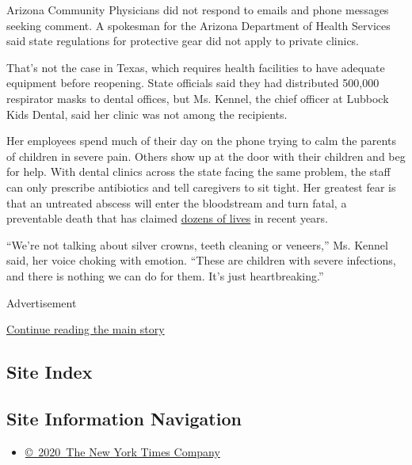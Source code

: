 Arizona Community Physicians did not respond to emails and phone
messages seeking comment. A spokesman for the Arizona Department of
Health Services said state regulations for protective gear did not apply
to private clinics.

That's not the case in Texas, which requires health facilities to have
adequate equipment before reopening. State officials said they had
distributed 500,000 respirator masks to dental offices, but Ms. Kennel,
the chief officer at Lubbock Kids Dental, said her clinic was not among
the recipients.

Her employees spend much of their day on the phone trying to calm the
parents of children in severe pain. Others show up at the door with
their children and beg for help. With dental clinics across the state
facing the same problem, the staff can only prescribe antibiotics and
tell caregivers to sit tight. Her greatest fear is that an untreated
abscess will enter the bloodstream and turn fatal, a preventable death
that has claimed
\href{https://well.blogs.nytimes3xbfgragh.onion/2013/08/30/oral-infections-causing-more-hospitalizations/}{dozens
of lives} in recent years.

``We're not talking about silver crowns, teeth cleaning or veneers,''
Ms. Kennel said, her voice choking with emotion. ``These are children
with severe infections, and there is nothing we can do for them. It's
just heartbreaking.''

Advertisement

\protect\hyperlink{after-bottom}{Continue reading the main story}

\hypertarget{site-index}{%
\subsection{Site Index}\label{site-index}}

\hypertarget{site-information-navigation}{%
\subsection{Site Information
Navigation}\label{site-information-navigation}}

\begin{itemize}
\tightlist
\item
  \href{https://help.nytimes3xbfgragh.onion/hc/en-us/articles/115014792127-Copyright-notice}{©~2020~The
  New York Times Company}
\end{itemize}

